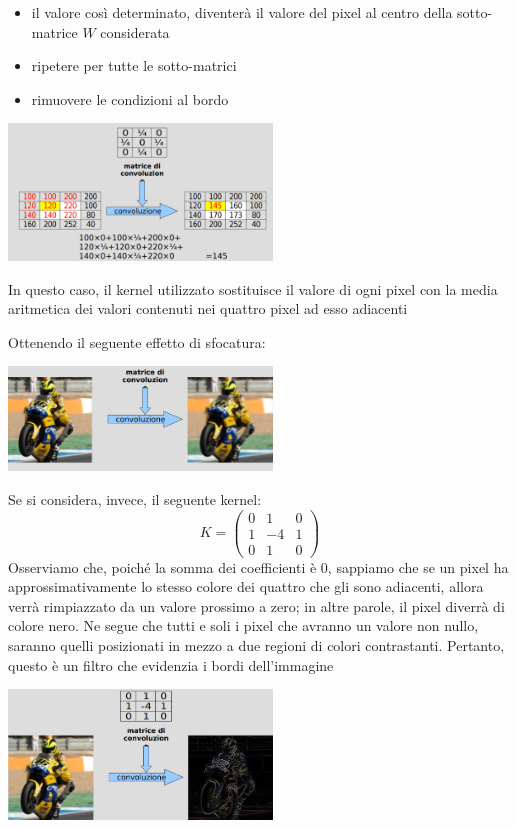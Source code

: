 {\begin{itemize}
        \item il valore così determinato, diventerà il valore del pixel al centro della sotto-matrice $W$ considerata
        \item ripetere per tutte le sotto-matrici
        \item rimuovere le condizioni al bordo
    \end{itemize}
    \begin{center}
        \includegraphics[width=7cm]{img/convoluzione_zio_pera.png}
    \end{center}
    In questo caso, il kernel utilizzato sostituisce il valore di ogni pixel con la media aritmetica dei valori contenuti nei quattro pixel ad esso adiacenti

    Ottenendo il seguente effetto di sfocatura:
    \begin{center}
        \includegraphics[width=7cm]{img/sfocatura.png}
    \end{center}

    Se si considera, invece, il seguente kernel:
    \[
      K = \begin{pmatrix}
            0&1&0\\
            1&-4&1 \\
            0&1&0
      \end{pmatrix}
    \]
    Osserviamo che, poiché la somma dei coefficienti è 0, sappiamo che se un pixel ha approssimativamente lo stesso colore dei quattro che gli sono adiacenti, allora verrà rimpiazzato da un valore prossimo a zero; in altre parole, il pixel diverrà di colore nero.
    Ne segue che tutti e soli i pixel che avranno un valore non nullo, saranno quelli posizionati in mezzo a due regioni di colori contrastanti. Pertanto, questo è un filtro che evidenzia i bordi dell’immagine
    \begin{center}
        \includegraphics[width=7cm]{img/bordizzatura.png}
    \end{center}
}

